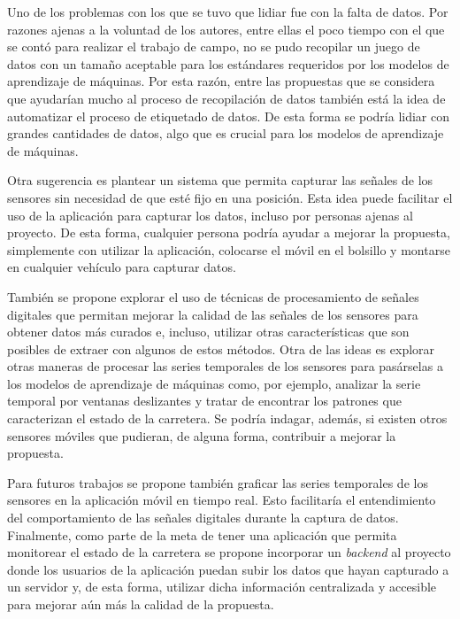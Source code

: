 \begin{recomendations}
	Uno de los problemas con los que se tuvo que lidiar fue con la falta de datos. Por razones ajenas a la voluntad de los autores,
	entre ellas el poco tiempo con el que se contó para realizar el trabajo de campo, no se pudo recopilar un juego de datos con un 
	tamaño aceptable para los estándares requeridos por los modelos de aprendizaje de máquinas. Por esta razón, entre las propuestas
	que se considera que ayudarían mucho al proceso de recopilación de datos también está la idea de automatizar el proceso de
	etiquetado de datos. De esta forma se podría lidiar con grandes cantidades de datos, algo que es crucial para los modelos de
	aprendizaje de máquinas.

	Otra sugerencia es plantear un sistema que permita capturar las señales de los sensores sin necesidad de que
	esté fijo en una posición. Esta idea puede facilitar el uso de la aplicación para capturar los datos, incluso por personas ajenas
	al proyecto. De esta forma, cualquier persona podría ayudar a mejorar la propuesta, simplemente con utilizar la aplicación, colocarse
	el móvil en el bolsillo y montarse en cualquier vehículo para capturar datos.

	También se propone explorar el uso de técnicas de procesamiento de señales digitales que permitan mejorar la calidad de las señales
	de los sensores para obtener datos más curados e, incluso, utilizar otras características que son posibles de extraer con algunos de
	estos métodos. Otra de las ideas es explorar otras maneras de procesar las series temporales de los sensores para pasárselas a los
	modelos de aprendizaje de máquinas como, por ejemplo, analizar la serie temporal por ventanas deslizantes y tratar de encontrar los
	patrones que caracterizan el estado de la carretera. Se podría indagar, además, si existen otros sensores móviles que pudieran, de
	alguna forma, contribuir a mejorar la propuesta.

	Para futuros trabajos se propone también graficar las series temporales de los sensores en la aplicación móvil en tiempo real.
	Esto facilitaría el entendimiento del comportamiento de las señales digitales durante la captura de datos. Finalmente, como parte
	de la meta de tener una aplicación que permita monitorear el estado de la carretera se propone incorporar un \emph{backend} al
	proyecto donde los usuarios de la aplicación puedan subir los datos que hayan capturado a un servidor y, de esta forma, utilizar
	dicha información centralizada y accesible para mejorar aún más la calidad de la propuesta.
\end{recomendations}
